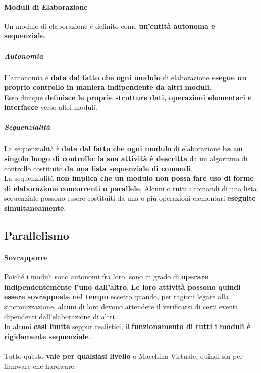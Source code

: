 \documentclass[10pt]{report}
\begin{document}
\paragraph{Moduli di Elaborazione} Un modulo di elaborazione è definito come \textbf{un'entità autonoma e sequenziale}.
\subparagraph{Autonomia} L'autonomia è \textbf{data dal fatto che ogni modulo} di elaborazione \textbf{esegue un proprio controllo in maniera indipendente da altri moduli}.\\
Esso dunque \textbf{definisce le proprie strutture dati, operazioni elementari e interfacce} verso altri moduli.
\subparagraph{Sequenzialità} La sequenzialità è \textbf{data dal fatto che ogni modulo} di elaborazione \textbf{ha un singolo luogo di controllo}: \textbf{la sua attività è descritta} da un algoritmo di controllo costituito \textbf{da una lista sequenziale di comandi}.\\
La sequenzialità \textbf{non implica che un modulo non possa fare uso di forme di elaborazione concorrenti o parallele}. Alcuni o tutti i comandi di una lista sequenziale possono essere costituiti da una o più operazioni elementari \textbf{eseguite simultaneamente}.
\subsection{Parallelismo}
\paragraph{Sovrapporre} Poiché i moduli sono autonomi fra loro, sono in grado di \textbf{operare indipendentemente l'uno dall'altro}. \textbf{Le loro attività possono quindi essere sovrapposte nel tempo} eccetto quando, per ragioni legate alla sincronizzazione, alcuni di loro devono attendere il verificarsi di certi eventi dipendenti dall'elaborazione di altri.\\
In alcuni \textbf{casi limite} seppur realistici, il \textbf{funzionamento di tutti i moduli è rigidamente sequenziale}.\\\\
Tutto questo \textbf{vale per qualsiasi livello} o Macchina Virtuale, quindi sia per firmware che hardware.
\pagebreak
\end{document}

